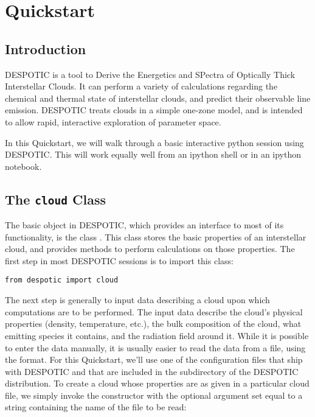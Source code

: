 \documentclass[letterpaper,10pt,english]{sphinxmanual}
\begin{document}
\chapter{Quickstart}
\label{quickstart::doc}\label{quickstart:quickstart}

\section{Introduction}
\label{quickstart:introduction}
DESPOTIC is a tool to Derive the Energetics and SPectra of
Optically Thick Interstellar Clouds. It can perform a
variety of calculations regarding the chemical and thermal state of
interstellar clouds, and predict their observable line
emission. DESPOTIC treats clouds in a simple one-zone model, and is
intended to allow rapid, interactive exploration of parameter space.

In this Quickstart, we will walk through a basic interactive python
session using DESPOTIC. This will work equally well from an ipython
shell or in an ipython notebook.


\section{The \texttt{cloud} Class}
\label{quickstart:the-cloud-class}
The basic object in DESPOTIC, which provides an interface to most of
its functionality, is the class . This class stores the basic
properties of an interstellar cloud, and provides methods to perform
calculations on those properties. The first step in most DESPOTIC
sessions is to import this class:

\begin{Verbatim}[commandchars=\\\{\}]
from despotic import cloud
\end{Verbatim}

The next step is generally to input data describing a cloud upon which
computations are to be performed. The input data describe the cloud's
physical properties (density, temperature, etc.), the bulk composition
of the cloud, what emitting species it contains, and the radiation
field around it. While it is possible to enter the data manually, it
is usually easier to read the data from a file, using the
{\hyperref[cloudfiles:sec-cloudfiles]{\emph{}}} format. For this Quickstart, we'll use one of
the configuration files that ship with DESPOTIC and that are
included in the  subdirectory of the DESPOTIC
distribution. To create a cloud whose properties are as given in
a particular cloud file, we simply invoke the constructor with
the  optional argument set equal to a string containing
the name of the file to be read:
\end{document}
